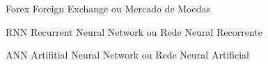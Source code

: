 \begin{siglas}
  \item[Forex] Foreign Exchange ou Mercado de Moedas
  \item[RNN] Recurrent Neural Network ou Rede Neural Recorrente
  \item[ANN] Artifitial Neural Network ou Rede Neural Artificial
\end{siglas}
